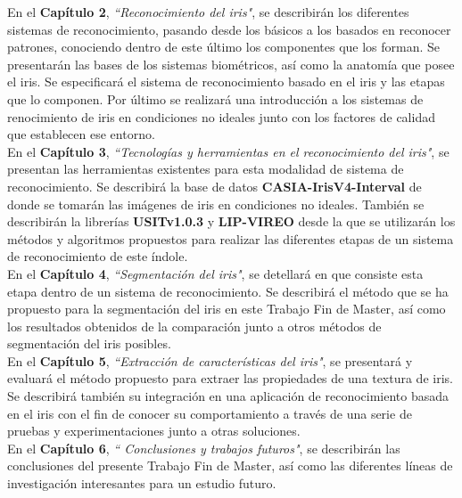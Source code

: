 En el \textbf{Capítulo 2}, \emph{``Reconocimiento del iris"}, se describirán los diferentes sistemas de reconocimiento, pasando desde los básicos a los basados en reconocer patrones, conociendo dentro de este último los componentes que los forman. Se presentarán las bases de los sistemas biométricos, así como la anatomía que posee el iris. Se especificará el sistema de reconocimiento basado en el iris y las etapas que lo componen. Por último se realizará una introducción a los sistemas de renocimiento de iris en condiciones no ideales junto con los factores de calidad que establecen ese entorno. \\

En el \textbf{Capítulo 3}, \emph{``Tecnologías y herramientas en el reconocimiento del iris"}, se presentan las herramientas existentes para esta modalidad de sistema de reconocimiento. Se describirá la base de datos \textbf{CASIA-IrisV4-Interval} de donde se tomarán las imágenes de iris en condiciones no ideales. También se describirán la librerías \textbf{USITv1.0.3} y \textbf{LIP-VIREO} desde la que se utilizarán los métodos y algoritmos propuestos para realizar las diferentes etapas de un sistema de reconocimiento de este índole. \\

En el \textbf{Capítulo 4}, \emph{``Segmentación del iris"}, se detellará en que consiste esta etapa dentro de un sistema de reconocimiento. Se describirá el método que se ha propuesto para la segmentación del iris en este Trabajo Fin de Master, así como los resultados obtenidos de la comparación junto a otros métodos de segmentación del iris posibles. \\

En el \textbf{Capítulo 5}, \emph{``Extracción de características del iris"}, se presentará y evaluará el método propuesto para extraer las propiedades de una textura de iris. Se describirá también su integración en una aplicación de reconocimiento basada en el iris con el fin de conocer su comportamiento a través de una serie de pruebas y experimentaciones junto a otras soluciones. \\

En el \textbf{Capítulo 6}, \emph{`` Conclusiones y trabajos futuros"}, se describirán las conclusiones del presente Trabajo Fin de Master, así como las diferentes líneas de investigación interesantes para un estudio futuro. \\
